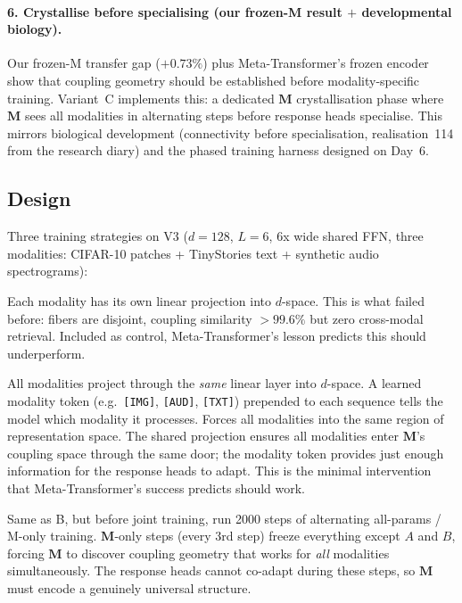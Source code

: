 \documentclass[11pt, a4paper]{article}
\newcommand{\M}{\mathbf{M}}
\theoremstyle{plain}
\theoremstyle{remark}
\begin{document}
\paragraph{6. Crystallise before specialising (our frozen-M result $+$ developmental biology).}
Our frozen-M transfer gap ($+0.73\%$) plus Meta-Transformer's frozen encoder show that coupling geometry should be established before modality-specific training.
Variant~C implements this: a dedicated $\M$ crystallisation phase where $\M$ sees all modalities in alternating steps before response heads specialise.
This mirrors biological development (connectivity before specialisation, realisation~114 from the research diary) and the phased training harness designed on Day~6.

\subsection{Design}

Three training strategies on V3 ($d{=}128$, $L{=}6$, 6x wide shared FFN, three modalities: CIFAR-10 patches + TinyStories text + synthetic audio spectrograms):

\begin{description}[nosep]
\item[A: Separate projections (baseline).] Each modality has its own linear projection into $d$-space.
This is what failed before: fibers are disjoint, coupling similarity $>99.6\%$ but zero cross-modal retrieval.
Included as control, Meta-Transformer's lesson predicts this should underperform.
\item[B: Shared projection + modality tokens.] All modalities project through the \emph{same} linear layer into $d$-space.
A learned modality token (e.g.\ \texttt{[IMG]}, \texttt{[AUD]}, \texttt{[TXT]}) prepended to each sequence tells the model which modality it processes.
Forces all modalities into the same region of representation space.
The shared projection ensures all modalities enter $\M$'s coupling space through the same door; the modality token provides just enough information for the response heads to adapt.
This is the minimal intervention that Meta-Transformer's success predicts should work.
\item[C: B + M crystallisation phase.] Same as B, but before joint training, run 2000 steps of alternating all-params / M-only training.
$\M$-only steps (every 3rd step) freeze everything except $A$ and $B$, forcing $\M$ to discover coupling geometry that works for \emph{all} modalities simultaneously.
The response heads cannot co-adapt during these steps, so $\M$ must encode a genuinely universal structure.
\end{description}
\end{document}
